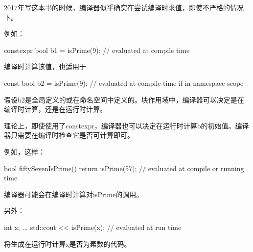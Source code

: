 \begin{notice}
2017年写这本书的时候，编译器似乎确实在尝试编译时求值，即使不严格的情况下。
\end{notice}

例如：

\begin{cpp}
constexpr bool b1 = isPrime(9); // evaluated at compile time
\end{cpp}

编译时计算该值，也适用于

\begin{cpp}
const bool b2 = isPrime(9); // evaluated at compile time if in namespace scope
\end{cpp}

假设b2是全局定义的或在命名空间中定义的。块作用域中，编译器可以决定是在编译时计算，还是在运行时计算。

\begin{notice}
理论上，即使使用了constexpr，编译器也可以决定在运行时计算b的初始值。编译器只需要在编译时检查它是否可计算即可。
\end{notice}

例如，这样：

\begin{cpp}
bool fiftySevenIsPrime() {
	return isPrime(57); // evaluated at compile or running time
}
\end{cpp}

编译器可能会在编译时计算对isPrime的调用。

另外：

\begin{cpp}
int x;
...
std::cout << isPrime(x); // evaluated at run time
\end{cpp}

将生成在运行时计算x是否为素数的代码。

